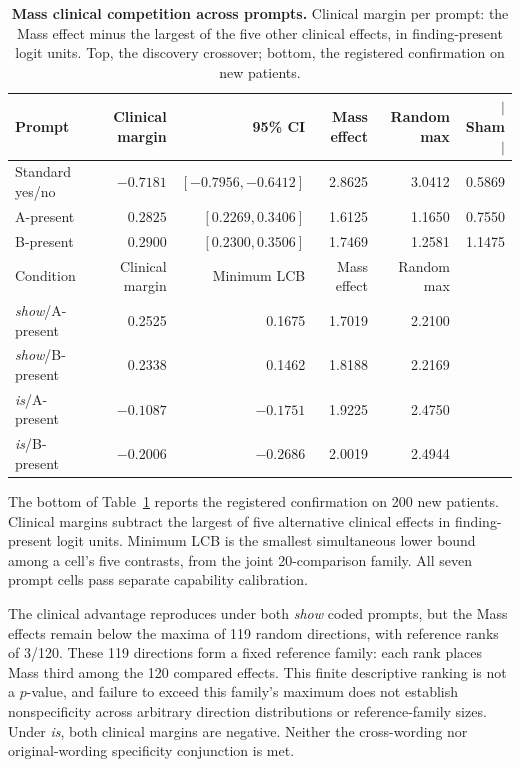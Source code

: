 \documentclass{article}
\begin{document}
\begin{table}[H]
\centering
\scriptsize
\setlength{\tabcolsep}{5pt}
\caption{\textbf{Mass clinical competition across prompts.} Clinical margin per prompt: the Mass effect minus the largest of the five other clinical effects, in finding-present logit units. Top, the discovery crossover; bottom, the registered confirmation on new patients.}
\label{tab:seed-mass}
\begin{tabular}{lrrrrr}
\toprule
Prompt & Clinical margin & 95\% CI & Mass effect & Random max & $|$Sham$|$ \\
\midrule
Standard yes/no & $-0.7181$ & $[-0.7956,-0.6412]$ & 2.8625 & 3.0412 & 0.5869 \\
A-present & $0.2825$ & $[0.2269,0.3406]$ & 1.6125 & 1.1650 & 0.7550 \\
B-present & $0.2900$ & $[0.2300,0.3506]$ & 1.7469 & 1.2581 & 1.1475 \\
\midrule
Condition & Clinical margin & Minimum LCB & Mass effect & Random max & \\
\midrule
\textit{show}/A-present & 0.2525 & 0.1675 & 1.7019 & 2.2100 & \\
\textit{show}/B-present & 0.2338 & 0.1462 & 1.8188 & 2.2169 & \\
\textit{is}/A-present & $-0.1087$ & $-0.1751$ & 1.9225 & 2.4750 & \\
\textit{is}/B-present & $-0.2006$ & $-0.2686$ & 2.0019 & 2.4944 & \\
\bottomrule
\end{tabular}
\end{table}

The bottom of Table~\ref{tab:seed-mass} reports the registered confirmation on 200 new patients. Clinical margins subtract the largest of five alternative clinical effects in finding-present logit units. Minimum LCB is the smallest simultaneous lower bound among a cell's five contrasts, from the joint 20-comparison family. All seven prompt cells pass separate capability calibration.

The clinical advantage reproduces under both \textit{show} coded prompts, but the Mass effects remain below the maxima of 119 random directions, with reference ranks of 3/120. These 119 directions form a fixed reference family: each rank places Mass third among the 120 compared effects. This finite descriptive ranking is not a $p$-value, and failure to exceed this family's maximum does not establish nonspecificity across arbitrary direction distributions or reference-family sizes. Under \textit{is}, both clinical margins are negative. Neither the cross-wording nor original-wording specificity conjunction is met.
\end{document}
